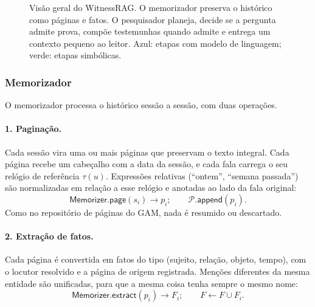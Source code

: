 \documentclass[11pt]{article}
\newcommand{\op}[1]{\textsf{#1}}
\begin{document}
\begin{figure}[t]
{}
\caption{Visão geral do WitnessRAG. O memorizador preserva o histórico como
páginas e fatos. O pesquisador planeja, decide se a pergunta admite prova,
compõe testemunhas quando admite e entrega um contexto pequeno ao leitor.
Azul: etapas com modelo de linguagem; verde: etapas simbólicas.}
\label{fig:arquitetura}
\end{figure}

\subsubsection{Memorizador}

O memorizador processa o histórico sessão a sessão, com duas operações.

\paragraph{1. Paginação.} Cada sessão vira uma ou mais páginas que preservam o
texto integral. Cada página recebe um cabeçalho com a data da sessão, e cada
fala carrega o seu relógio de referência $\tau(u)$. Expressões relativas
(``ontem'', ``semana passada'') são normalizadas em relação a esse relógio e
anotadas ao lado da fala original:
\begin{equation}
\op{Memorizer.page}(s_i)\rightarrow p_i;\qquad \mathcal{P}.\op{append}(p_i).
\label{eq:page}
\end{equation}
Como no repositório de páginas do GAM, nada é resumido ou descartado.

\paragraph{2. Extração de fatos.} Cada página é convertida em fatos do tipo
(sujeito, relação, objeto, tempo), com o locutor resolvido e a página de
origem registrada. Menções diferentes da mesma entidade são unificadas, para
que a mesma coisa tenha sempre o mesmo nome:
\begin{equation}
\op{Memorizer.extract}(p_i)\rightarrow F_i;\qquad F\leftarrow F\cup F_i.
\label{eq:extract}
\end{equation}
\end{document}
